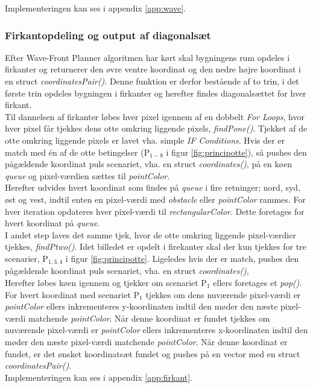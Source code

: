 Implementeringen kan ses i appendix \ref{app:wave}.



\subsubsection{Firkantopdeling og output af diagonalsæt}
Efter Wave-Front Planner algoritmen har kørt skal bygningens rum opdeles i firkanter og returnerer den øvre ventre koordinat og den nedre højre koordinat i en struct \emph{coordinatesPair()}. Denne funktion er derfor bestående af to trin, i det første trin opdeles bygningen i firkanter og herefter findes diagonalsættet for hver firkant.\\
Til dannelsen af firkanter løbes hver pixel igennem af en dobbelt \emph{For Loops}, hvor hver pixel får tjekkes dens otte omkring liggende pixels, \emph{findPone()}. Tjekket af de otte omkring liggende pixels er lavet vha. simple \emph{IF Conditions}. Hvis der er match med én af de otte betingelser (P\(_{1-8}\) i figur \ref{fig:principotte}), så pushes den pågældende koordinat puls scenariet, vha. en struct \emph{coordinates()}, på en køen \emph{queue} og pixel-værdien sættes til \emph{pointColor}.\\
Herefter udvides hvert koordinat som findes på \emph{queue} i fire retninger; nord, syd, øst og vest, indtil enten en pixel-værdi med \emph{obstacle} eller \emph{pointColor} rammes. For hver iteration opdateres hver pixel-værdi til \emph{rectangularColor}. Dette foretages for hvert koordinat på \emph{queue}.\\

I andet step laves det samme tjek, hvor de otte omkring liggende pixel-værdier tjekkes, \emph{findPtwo()}. Idet billedet er opdelt i firekanter skal der kun tjekkes for tre scenarier, P\(_{1, 3, 4}\) i figur \ref{fig:principotte}. Ligeledes hvis der er match, pushes den pågældende koordinat puls scenariet, vha. en struct \emph{coordinates()},\\
Herefter løbes køen igennem og tjekker om scenariet P\(_{1}\) ellers foretages et \emph{pop()}. For hvert koordinat med scenariet P\(_{1}\) tjekkes om dens nuværende pixel-værdi er \emph{pointColor} ellers inkrementeres y-koordinaten indtil den møder den næste pixel-værdi matchende \emph{pointColor}. Når denne koordinat er fundet tjekkes om nuværende pixel-værdi er \emph{pointColor} ellers inkrementeres x-koordinaten indtil den møder den næste pixel-værdi matchende \emph{pointColor}. Når denne koordinat er fundet, er det ønsket koordinatsæt fundet og pushes på en vector med en struct \emph{coordinatesPair()}.\\
Implementeringen kan ses i appendix \ref{app:firkant}. 

